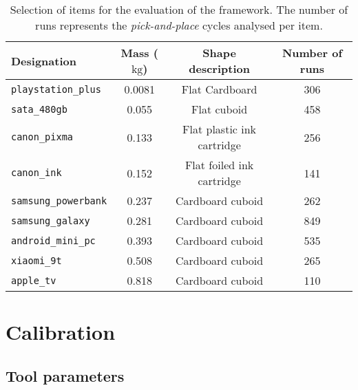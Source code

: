 \documentclass[/home/francois/latex/report/main.tex]{subfiles}
\begin{document}
\begin{table}[h]
  \begin{center}
    \renewcommand{\arraystretch}{1.2} %
    \begin{tabular}{l|c|c|c} %
      \textbf{Designation} & \textbf{Mass ($\si{\kilogram}$)} & \textbf{Shape description} & \textbf{Number of runs}\\
      \hline
      \texttt{playstation\_plus}  & 0.0081 & Flat Cardboard & 306 \\
      \hline
      \texttt{sata\_480gb}  & 0.055 & Flat cuboid & 458\\
      \hline
      \texttt{canon\_pixma}  & 0.133 & Flat plastic ink cartridge & 256\\
      \hline
      \texttt{canon\_ink}  & 0.152 & Flat foiled ink cartridge & 141 \\
      \hline
      \texttt{samsung\_powerbank}  & 0.237 & Cardboard cuboid & 262\\
      \hline
      \texttt{samsung\_galaxy}  & 0.281 & Cardboard cuboid & 849 \\
      \hline
      \texttt{android\_mini\_pc}  & 0.393 & Cardboard cuboid & 535\\
      \hline
      \texttt{xiaomi\_9t}  & 0.508 & Cardboard cuboid & 265 \\
      \hline
      \texttt{apple\_tv}  & 0.818 & Cardboard cuboid & 110 \\
      \hline
    \end{tabular}
  \end{center}
  \caption{Selection of items for the evaluation of the framework. The number of runs represents the \textit{pick-and-place} cycles analysed per item. \label{tab:setup:items}}
\end{table}

\section{Calibration}

\subsection{Tool parameters}
\label{subsection:setup:calibration:tool}
\end{document}
